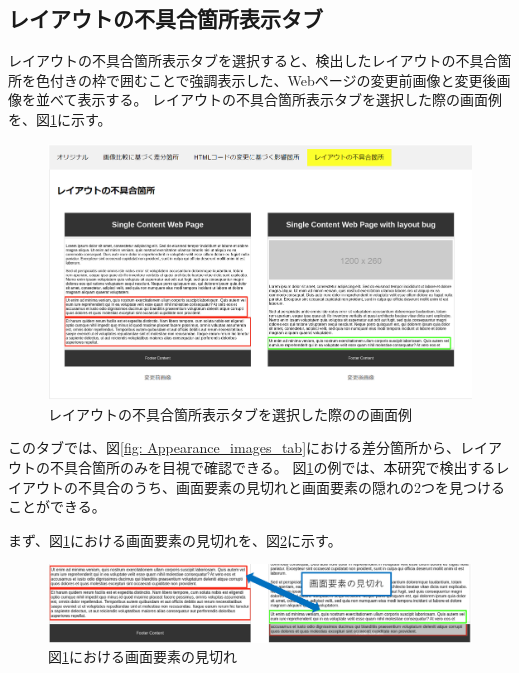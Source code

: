 \subsection{レイアウトの不具合箇所表示タブ}\label{subsec:subeffect_tab}
レイアウトの不具合箇所表示タブを選択すると、検出したレイアウトの不具合箇所を色付きの枠で囲むことで強調表示した、Webページの変更前画像と変更後画像を並べて表示する。
レイアウトの不具合箇所表示タブを選択した際の画面例を、図\ref{fig: Appearance_subEffect_tab}に示す。
\begin{figure}[tp]
    \begin{center}
        \includegraphics[width=1.0\columnwidth]{image/3_subEffect_tab2.png}
        \caption{レイアウトの不具合箇所表示タブを選択した際の\toolName の画面例}
        \label{fig: Appearance_subEffect_tab}
    \end{center}
\end{figure}
このタブでは、図\ref{fig: Appearance_images_tab}における差分箇所から、レイアウトの不具合箇所のみを目視で確認できる。
図\ref{fig: Appearance_subEffect_tab}の例では、本研究で検出するレイアウトの不具合のうち、画面要素の見切れと画面要素の隠れの2つを見つけることができる。
\par
まず、図\ref{fig: Appearance_subEffect_tab}における画面要素の見切れを、図\ref{fig: out_of_element}に示す。
\begin{figure}[tp]
    \begin{center}
        \includegraphics[width=1.0\columnwidth]{image/3_out_of_element2.png}
        \caption{図\ref{fig: Appearance_subEffect_tab}における画面要素の見切れ}
        \label{fig: out_of_element}
    \end{center}
\end{figure}
